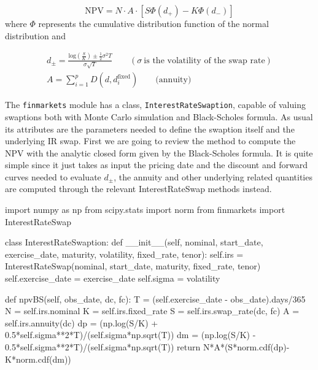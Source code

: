 \begin{equation}
\mathrm{NPV} = N\cdot A\cdot [S \Phi(d_+) - K\Phi(d_-)]
\end{equation}
where $\Phi$ represents the cumulative distribution function of the normal distribution and

\begin{equation}
\begin{gathered}
d_{\pm} = \frac{\mathrm{log}(\frac{S}{K}) \pm \frac{1}{2}\sigma^{2}T}{\sigma\sqrt{T}}\qquad(\sigma~\textrm{is the volatility of the swap rate})\\
A = \sum_{i=1}^{p}D(d, d_{i}^{\mathrm{fixed}})\qquad\mathrm{(annuity})
\end{gathered}
\end{equation}

\begin{finmarkets}
The \texttt{finmarkets} module has a class, \texttt{InterestRateSwaption}, capable of valuing swaptions both with Monte Carlo simulation and Black-Scholes formula. As usual its attributes are the parameters needed to define the swaption itself and the underlying IR swap. First we are going to review the method to compute the NPV with the analytic closed form given by the Black-Scholes formula. It is quite simple since it just takes as input the pricing date and the discount and forward curves needed to evaluate $d_{\pm}$, the annuity and other underlying related quantities are computed through the relevant InterestRateSwap methods instead.
\end{finmarkets}

\begin{ipython}
import numpy as np
from scipy.stats import norm 
from finmarkets import InterestRateSwap

class InterestRateSwaption:
    def __init__(self, nominal, start_date, exercise_date, maturity,
                 volatility, fixed_rate, tenor):
        self.irs = InterestRateSwap(nominal, start_date, maturity, fixed_rate, tenor)
        self.exercise_date = exercise_date
        self.sigma = volatility
        
    def npvBS(self, obs_date, dc, fc):
        T = (self.exercise_date - obs_date).days/365
        N = self.irs.nominal
        K = self.irs.fixed_rate
        S = self.irs.swap_rate(dc, fc)
        A = self.irs.annuity(dc)
        dp = (np.log(S/K) + 0.5*self.sigma**2*T)/(self.sigma*np.sqrt(T))
        dm = (np.log(S/K) - 0.5*self.sigma**2*T)/(self.sigma*np.sqrt(T))
        return N*A*(S*norm.cdf(dp)-K*norm.cdf(dm))
\end{ipython}

